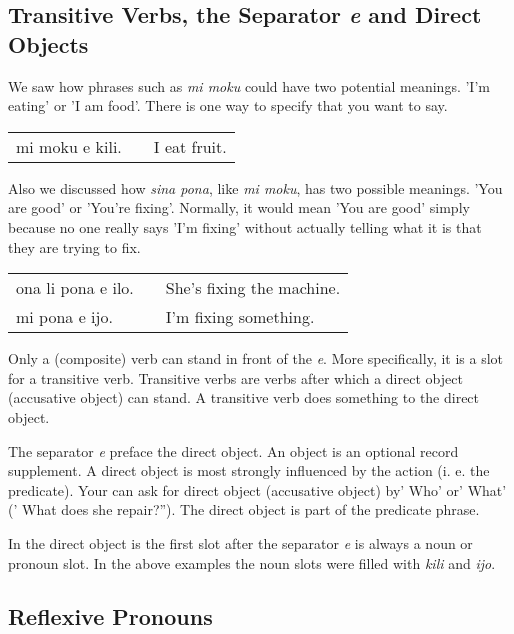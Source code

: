 \subsection*{Transitive Verbs, the Separator \textit{e} and Direct Objects}
%
We saw how phrases such as \textit{mi moku} could have two potential meanings. 
'I'm eating' or 'I am food'. 
There is one way to specify that you want to say. 

\begin{supertabular}{p{5,5cm}|ll}
mi moku e kili. && I eat fruit. \\
\end{supertabular} 

Also we discussed how \textit{sina pona}, like \textit{mi moku}, has two possible meanings. 'You are good' or 'You're fixing'. 
Normally, it would mean 'You are good' simply because no one really says 'I'm fixing' without actually telling what it is that they are trying to fix. 

\begin{supertabular}{p{5,5cm}|ll}
ona li pona e ilo. && She's fixing the machine. \\
mi pona e ijo. && I'm fixing something. \\
\end{supertabular} 

Only a (composite) verb can stand in front of the \textit{e}. 
More specifically, it is a slot for a transitive verb. 
Transitive verbs are verbs after which a direct object (accusative object) can stand. 
A transitive verb does something to the direct object. 

The separator \textit{e} preface the direct object.
An object is an optional record supplement. 
A direct object is most strongly influenced by the action (i. e. the predicate).
Your can ask for direct object (accusative object) by' Who' or' What' (' What does she repair?'').
The direct object is part of the predicate phrase. 

In the direct object is the first slot after the separator \textit{e} is always a noun or pronoun slot.
In the above examples the noun slots were filled with \textit{kili} and \textit{ijo}. 

%
\subsection*{Reflexive Pronouns}

